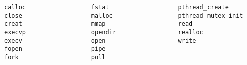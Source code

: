 \PreTable

\begin{lstlisting}[captionpos=b, label={lst:small_scale_wrappers},caption={Wrapped calls for testing small-scale utilities}]
calloc                  fstat                   pthread_create
close                   malloc                  pthread_mutex_init
creat                   mmap                    read
execvp                  opendir                 realloc
execv                   open                    write
fopen                   pipe
fork                    poll
\end{lstlisting}

\PostTable
